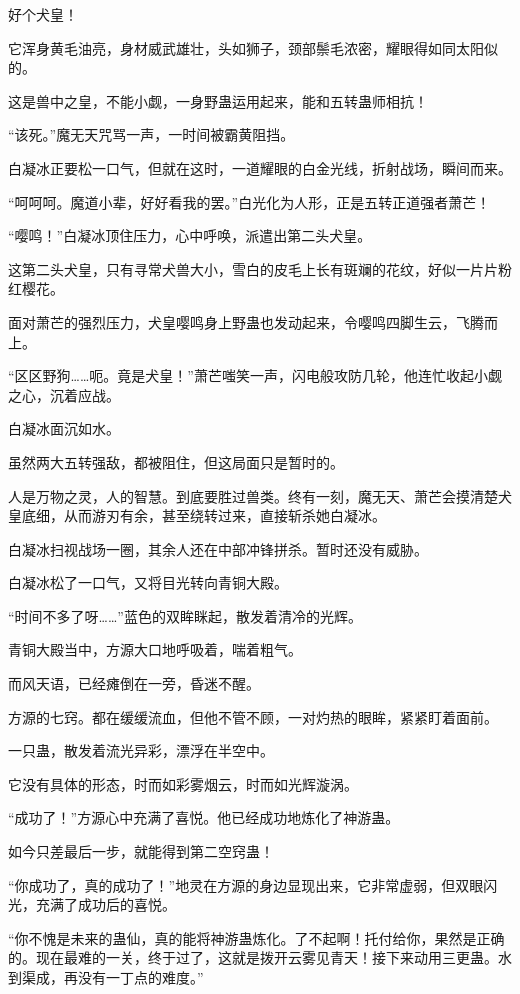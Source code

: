 \begin{this_body}
好个犬皇！

它浑身黄毛油亮，身材威武雄壮，头如狮子，颈部鬃毛浓密，耀眼得如同太阳似的。

这是兽中之皇，不能小觑，一身野蛊运用起来，能和五转蛊师相抗！

“该死。”魔无天咒骂一声，一时间被霸黄阻挡。

白凝冰正要松一口气，但就在这时，一道耀眼的白金光线，折射战场，瞬间而来。

“呵呵呵。魔道小辈，好好看我的罢。”白光化为人形，正是五转正道强者萧芒！

“嘤鸣！”白凝冰顶住压力，心中呼唤，派遣出第二头犬皇。

这第二头犬皇，只有寻常犬兽大小，雪白的皮毛上长有斑斓的花纹，好似一片片粉红樱花。

面对萧芒的强烈压力，犬皇嘤鸣身上野蛊也发动起来，令嘤鸣四脚生云，飞腾而上。

“区区野狗……呃。竟是犬皇！”萧芒嗤笑一声，闪电般攻防几轮，他连忙收起小觑之心，沉着应战。

白凝冰面沉如水。

虽然两大五转强敌，都被阻住，但这局面只是暂时的。

人是万物之灵，人的智慧。到底要胜过兽类。终有一刻，魔无天、萧芒会摸清楚犬皇底细，从而游刃有余，甚至绕转过来，直接斩杀她白凝冰。

白凝冰扫视战场一圈，其余人还在中部冲锋拼杀。暂时还没有威胁。

白凝冰松了一口气，又将目光转向青铜大殿。

“时间不多了呀……”蓝色的双眸眯起，散发着清冷的光辉。

青铜大殿当中，方源大口地呼吸着，喘着粗气。

而风天语，已经瘫倒在一旁，昏迷不醒。

方源的七窍。都在缓缓流血，但他不管不顾，一对灼热的眼眸，紧紧盯着面前。

一只蛊，散发着流光异彩，漂浮在半空中。

它没有具体的形态，时而如彩雾烟云，时而如光辉漩涡。

“成功了！”方源心中充满了喜悦。他已经成功地炼化了神游蛊。

如今只差最后一步，就能得到第二空窍蛊！

“你成功了，真的成功了！”地灵在方源的身边显现出来，它非常虚弱，但双眼闪光，充满了成功后的喜悦。

“你不愧是未来的蛊仙，真的能将神游蛊炼化。了不起啊！托付给你，果然是正确的。现在最难的一关，终于过了，这就是拨开云雾见青天！接下来动用三更蛊。水到渠成，再没有一丁点的难度。”


\end{this_body}
